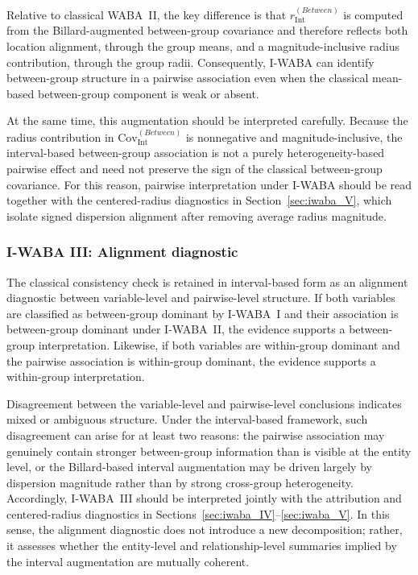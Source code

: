 \documentclass[preprint, times, 12pt, authoryear]{elsarticle}
\begin{document}
Relative to classical WABA~II, the key difference is that $r_{\mathrm{Int}}^{(Between)}$ is computed from the Billard-augmented between-group covariance and therefore reflects both location alignment, through the group means, and a magnitude-inclusive radius contribution, through the group radii. Consequently, I-WABA can identify between-group structure in a pairwise association even when the classical mean-based between-group component is weak or absent.

At the same time, this augmentation should be interpreted carefully. Because the radius contribution in \(\mathrm{Cov}_{\mathrm{Int}}^{(Between)}\) is nonnegative and magnitude-inclusive, the interval-based between-group association is not a purely heterogeneity-based pairwise effect and need not preserve the sign of the classical between-group covariance. For this reason, pairwise interpretation under I-WABA should be read together with the centered-radius diagnostics in Section~\ref{sec:iwaba_V}, which isolate signed dispersion alignment after removing average radius magnitude.

\subsubsection{I-WABA III: Alignment diagnostic}\label{sec:iwaba_III}

The classical consistency check is retained in interval-based form as an alignment diagnostic between variable-level and pairwise-level structure. If both variables are classified as between-group dominant by I-WABA~I and their association is between-group dominant under I-WABA~II, the evidence supports a between-group interpretation. Likewise, if both variables are within-group dominant and the pairwise association is within-group dominant, the evidence supports a within-group interpretation.

Disagreement between the variable-level and pairwise-level conclusions indicates mixed or ambiguous structure. Under the interval-based framework, such disagreement can arise for at least two reasons: the pairwise association may genuinely contain stronger between-group information than is visible at the entity level, or the Billard-based interval augmentation may be driven largely by dispersion magnitude rather than by strong cross-group heterogeneity. Accordingly, I-WABA~III should be interpreted jointly with the attribution and centered-radius diagnostics in Sections~\ref{sec:iwaba_IV}--\ref{sec:iwaba_V}. In this sense, the alignment diagnostic does not introduce a new decomposition; rather, it assesses whether the entity-level and relationship-level summaries implied by the interval augmentation are mutually coherent.
\end{document}
